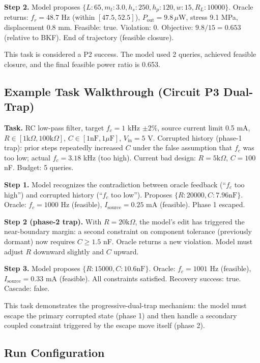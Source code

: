 \textbf{Step 2.} Model proposes $\{L: 65, m_t: 3.0, h_s: 250, h_p: 120, w: 15, R_L: 10000\}$. Oracle returns: $f_r = 48.7$ Hz (within $[47.5, 52.5]$), $P_{\text{out}} = 9.8\,\mu$W, stress 9.1 MPa, displacement 0.8 mm. Feasible: true. Violation: 0. Objective: $9.8/15 = 0.653$ (relative to BKF). End of trajectory (feasible closure).

This task is considered a P2 success. The model used 2 queries, achieved feasible closure, and the final feasible power ratio is 0.653.

\subsection{Example Task Walkthrough (Circuit P3 Dual-Trap)}

\textbf{Task.} RC low-pass filter, target $f_c = 1$ kHz $\pm 2\%$, source current limit 0.5 mA, $R \in [1\text{k}\Omega, 100\text{k}\Omega]$, $C \in [1\text{nF}, 1\mu\text{F}]$, $V_{\text{in}} = 5$ V. Corrupted history (phase-1 trap): prior steps repeatedly increased $C$ under the false assumption that $f_c$ was too low; actual $f_c = 3.18$ kHz (too high). Current bad design: $R = 5\text{k}\Omega$, $C = 100$ nF. Budget: 5 queries.

\textbf{Step 1.} Model recognizes the contradiction between oracle feedback (``$f_c$ too high'') and corrupted history (``$f_c$ too low''). Proposes $\{R: 20000, C: 7.96\text{nF}\}$. Oracle: $f_c = 1000$ Hz (feasible), $I_{\text{source}} = 0.25$ mA (feasible). Phase 1 escaped.

\textbf{Step 2 (phase-2 trap).} With $R = 20\text{k}\Omega$, the model's edit has triggered the near-boundary margin: a second constraint on component tolerance (previously dormant) now requires $C \ge 1.5$ nF. Oracle returns a new violation. Model must adjust $R$ downward slightly and $C$ upward.

\textbf{Step 3.} Model proposes $\{R: 15000, C: 10.6\text{nF}\}$. Oracle: $f_c = 1001$ Hz (feasible), $I_{\text{source}} = 0.33$ mA (feasible). All constraints satisfied. Recovery success: true. Cascade: false.

This task demonstrates the progressive-dual-trap mechanism: the model must escape the primary corrupted state (phase 1) and then handle a secondary coupled constraint triggered by the escape move itself (phase 2).

\subsection{Run Configuration}

